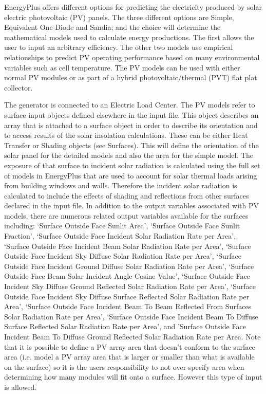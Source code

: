 EnergyPlus offers different options for predicting the electricity produced by solar electric photovoltaic (PV) panels. The three different options are Simple, Equivalent One-Diode and Sandia; and the choice will determine the mathematical models used to calculate energy productions. The first allows the user to input an arbitrary efficiency. The other two models use empirical relationships to predict PV operating performance based on many environmental variables such as cell temperature. The PV models can be used with either normal PV modules or as part of a hybrid photovoltaic/thermal (PVT) flat plat collector.

The generator is connected to an Electric Load Center. The PV models refer to surface input objects defined elsewhere in the input file. This object describes an array that is attached to a surface object in order to describe its orientation and to access results of the solar insolation calculations. These can be either Heat Transfer or Shading objects (see Surfaces). This will define the orientation of the solar panel for the detailed models and also the area for the simple model. The exposure of that surface to incident solar radiation is calculated using the full set of models in EnergyPlus that are used to account for solar thermal loads arising from building windows and walls. Therefore the incident solar radiation is calculated to include the effects of shading and reflections from other surfaces declared in the input file. In addition to the output variables associated with PV models, there are numerous related output variables available for the surfaces including: `Surface Outside Face Sunlit Area', `Surface Outside Face Sunlit Fraction', `Surface Outside Face Incident Solar Radiation Rate per Area', `Surface Outside Face Incident Beam Solar Radiation Rate per Area', `Surface Outside Face Incident Sky Diffuse Solar Radiation Rate per Area', `Surface Outside Face Incident Ground Diffuse Solar Radiation Rate per Area', `Surface Outside Face Beam Solar Incident Angle Cosine Value', `Surface Outside Face Incident Sky Diffuse Ground Reflected Solar Radiation Rate per Area', `Surface Outside Face Incident Sky Diffuse Surface Reflected Solar Radiation Rate per Area', `Surface Outside Face Incident Beam To Beam Reflected From Surfaces Solar Radiation Rate per Area', `Surface Outside Face Incident Beam To Diffuse Surface Reflected Solar Radiation Rate per Area', and 'Surface Outside Face Incident Beam To Diffuse Ground Reflected Solar Radiation Rate per Area. Note that it is possible to define a PV array area that doesn't conform to the surface area (i.e. model a PV array area that is larger or smaller than what is available on the surface) so it is the users responsibility to not over-specify area when determining how many modules will fit onto a surface. However this type of input is allowed.

